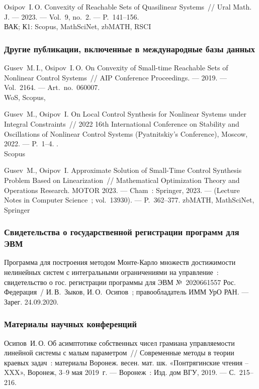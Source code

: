 \documentclass[../main.tex]{subfiles}
\begin{document}
\begin{thebibliography}{99}
Osipov~I.\,O. Convexity of Reachable Sets of Quasilinear Systems~// Ural Math. J. --- 2023. --- Vol.~9, no.~2. --- P.~141--156.
 \\
ВАК; К1: Scopus, MathSciNet, zbMATH, RSCI


\subsubsection*{Другие публикации, включенные в международные базы данных}
Gusev~M.\,I., Osipov~I.\,O. On Convexity of Small-time Reachable Sets of Nonlinear Control Systems~// AIP Conference Proceedings. --- 2019. --- Vol.~2164. --- Art.~no.~060007.
 \\
WoS, Scopus,

Gusev~M., Osipov~I. On Local Control Synthesis for Nonlinear Systems under Integral Constraints~// 2022 16th International Conference on Stability and Oscillations of Nonlinear Control Systems (Pyatnitskiy's Conference), Moscow, 2022. --- P.~1--4. .\\
Scopus

Gusev~M., Osipov~I. Approximate Solution of Small-Time Control Synthesis Problem Based on Linearization~// Mathematical Optimization Theory and Operations Research. MOTOR 2023. --- Cham~: Springer, 2023. --- (Lecture Notes in Computer Science~; vol.~13930). --- P.~362--377.
zbMATH, MathSciNet, Springer

\subsubsection*{Свидетельства о государственной регистрации программ для ЭВМ}
Программа для построения методом Монте-Карло множеств достижимости нелинейных систем с интегральными ограничениями на управление~: свидетельство о гос. регистрации программы для ЭВМ №~2020661557 Рос. Федерация~/\! И.\,В.~Зыков, И.\,О.~Осипов~; правообладатель ИММ УрО РАН. --- Зарег. 24.09.2020.

\subsubsection*{Материалы научных конференций}

Осипов~И.\,О. Об асимптотике собственных чисел грамиана управляемости линейной системы с малым параметром~// Современные методы в теории краевых задач~: материалы Воронеж. весен. мат. шк. «Понтрягинские чтения – XXX», Воронеж, 3--9 мая 2019~г. --- Воронеж~: Изд. дом ВГУ, 2019. --- С.~215--216.


\end{thebibliography}
\end{document}

